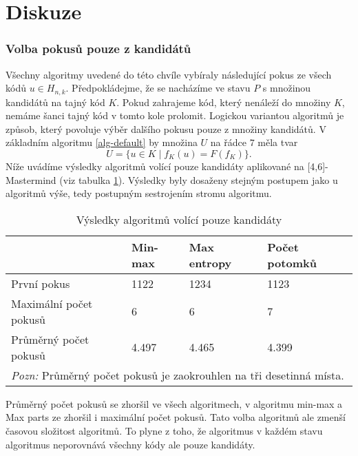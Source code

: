 
\section{Diskuze}
\subsubsection{Volba pokusů pouze z kandidátů}
Všechny algoritmy uvedené do této chvíle vybíraly následující pokus ze všech kódů $u\in H_{n,k}$. Předpokládejme, že se nacházíme ve stavu $P$ s množinou kandidátů na tajný kód $K$. Pokud zahrajeme kód, který nenáleží do množiny $K$, nemáme šanci tajný kód v tomto kole prolomit. Logickou variantou algoritmů je způsob, který povoluje výběr dalšího pokusu pouze z množiny kandidátů. V základním algoritmu \ref{alg-default} by množina $U$ na řádce $7$ měla tvar
\[U = \{u \in K \mid f_K(u) = F(f_K)\}.\]
Níže uvádíme výsledky algoritmů volící pouze kandidáty aplikované na [4,6]-Mastermind (viz tabulka \ref{tabpouzekandidati}). Výsledky byly dosaženy stejným postupem jako u algoritmů výše, tedy postupným sestrojením stromu algoritmu. 

\begin{table}[h]
\centering
\begin{tabular}{l l l l}
\toprule
 & Min-max & Max entropy & Počet potomků  \\
\midrule
První pokus 
& 1122 & 1234 & 1123  \\

Maximální počet pokusů 
& 6 & 6 & 7  \\

Průměrný počet pokusů 
& 4.497 & 4.465 & 4.399 \\
\bottomrule
\multicolumn{4}{l}{\footnotesize \textit{Pozn:}
Průměrný počet pokusů je zaokrouhlen na tři desetinná místa.}
\end{tabular}
\caption{Výsledky algoritmů volící pouze kandidáty}\label{tabpouzekandidati}
\end{table}

Průměrný počet pokusů se zhoršil ve všech algoritmech, v algoritmu min-max a Max parts ze zhoršil i maximální počet pokusů. Tato volba algoritmů ale zmenší časovou složitost algoritmů. To plyne z toho, že algoritmus v každém stavu algoritmus neporovnává všechny kódy ale pouze kandidáty. 

